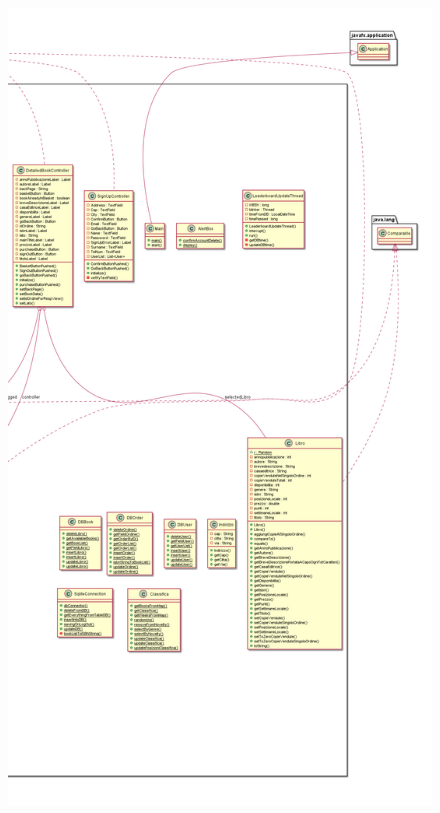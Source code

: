 \documentclass[a4paper,12pt,titlepage]{article}
\begin{document}
{{{\begin{figure}[H]
		\includegraphics[scale=0.21]{classDiagramParte3}
\end{figure}
}}}
\end{document}
